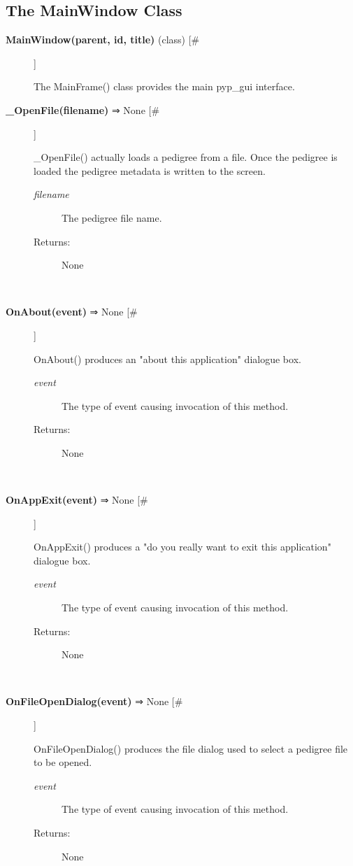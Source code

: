 \documentclass{article}
\begin{document}
\subsection*{The MainWindow Class}
\begin{description}
\item[\textbf{MainWindow(parent, id, title)} (class) [\#]
]
\par The MainFrame() class provides the main pyp\_gui interface.

\item[\textbf{\_OpenFile(filename)} ⇒ None [\#]
]
\par \_OpenFile() actually loads a pedigree from a file.  Once the pedigree is
loaded the pedigree metadata is written to the screen.
\begin{description}
\item[\textit{filename}
]
The pedigree file name.
\item[Returns:
]
None
\end{description}\\

\item[\textbf{OnAbout(event)} ⇒ None [\#]
]
\par OnAbout() produces an "about this application" dialogue box.
\begin{description}
\item[\textit{event}
]
The type of event causing invocation of this method.
\item[Returns:
]
None
\end{description}\\

\item[\textbf{OnAppExit(event)} ⇒ None [\#]
]
\par OnAppExit() produces a "do you really want to exit this application" dialogue box.
\begin{description}
\item[\textit{event}
]
The type of event causing invocation of this method.
\item[Returns:
]
None
\end{description}\\

\item[\textbf{OnFileOpenDialog(event)} ⇒ None [\#]
]
\par OnFileOpenDialog() produces the file dialog used to select a pedigree file to be opened.
\begin{description}
\item[\textit{event}
]
The type of event causing invocation of this method.
\item[Returns:
]
None
\end{description}\\


\end{description}
\end{document}
